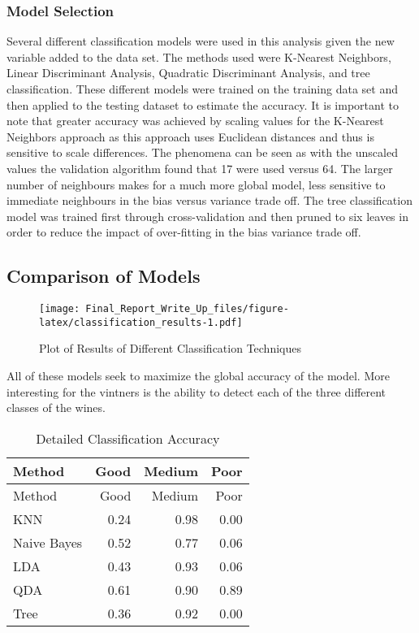 \documentclass[]{article}
\begin{document}
\subsubsection{Model Selection}\label{model-selection-1}

Several different classification models were used in this analysis given
the new variable added to the data set. The methods used were K-Nearest
Neighbors, Linear Discriminant Analysis, Quadratic Discriminant
Analysis, and tree classification. These different models were trained
on the training data set and then applied to the testing dataset to
estimate the accuracy. It is important to note that greater accuracy was
achieved by scaling values for the K-Nearest Neighbors approach as this
approach uses Euclidean distances and thus is sensitive to scale
differences. The phenomena can be seen as with the unscaled values the
validation algorithm found that 17 were used versus 64. The larger
number of neighbours makes for a much more global model, less sensitive
to immediate neighbours in the bias versus variance trade off. The tree
classification model was trained first through cross-validation and then
pruned to six leaves in order to reduce the impact of over-fitting in
the bias variance trade off.

\subsection{Comparison of Models}\label{comparison-of-models}

\begin{figure}[htbp]
\centering
\texttt{[image: Final\_Report\_Write\_Up\_files/figure-latex/classification\_results-1.pdf]}
\caption{Plot of Results of Different Classification Techniques}
\end{figure}

All of these models seek to maximize the global accuracy of the model.
More interesting for the vintners is the ability to detect each of the
three different classes of the wines.

\begin{longtable}[]{@{}lrrr@{}}
\caption{Detailed Classification Accuracy}\tabularnewline
\toprule
Method & Good & Medium & Poor\tabularnewline
\midrule
\endfirsthead
\toprule
Method & Good & Medium & Poor\tabularnewline
\midrule
\endhead
KNN & 0.24 & 0.98 & 0.00\tabularnewline
Naive Bayes & 0.52 & 0.77 & 0.06\tabularnewline
LDA & 0.43 & 0.93 & 0.06\tabularnewline
QDA & 0.61 & 0.90 & 0.89\tabularnewline
Tree & 0.36 & 0.92 & 0.00\tabularnewline
\bottomrule
\end{longtable}
\end{document}
